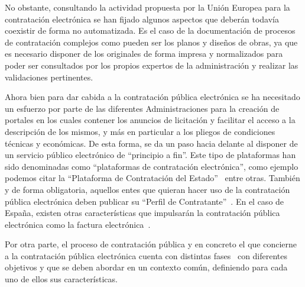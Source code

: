 No obstante, consultando la actividad propuesta por la Unión Europea para la contratación electrónica
se han fijado algunos aspectos que deberán todavía coexistir de forma no automatizada. Es el caso
de la documentación de procesos de contratación complejos como pueden ser los planos y diseños
de obras, ya que es necesario disponer de los originales de forma impresa y normalizados para poder ser consultados por
los propios expertos de la administración y realizar las validaciones pertinentes. 

Ahora bien para dar cabida a la contratación pública electrónica se ha necesitado un esfuerzo por parte
de las diferentes Administraciones para la creación de portales en los cuales contener los anuncios de licitación y facilitar
el acceso a la descripción de los mismos, y más en particular a los pliegos de condiciones técnicas y económicas. 
De esta forma, se da un paso hacia delante al disponer de un servicio público electrónico de ``principio a fin''. 
Este tipo de plataformas han sido denominadas como ``plataformas de contratación electrónica'', como ejemplo
podemos citar la ``Plataforma de Contratación del Estado''~\cite{PlataformaContratacionEstado} entre otras. 
También y de forma obligatoria, aquellos entes que quieran hacer uso de la contratación pública electrónica deben 
publicar su ``Perfil de Contratante''~\cite{PerfilContratante}. En el caso de España, existen otras características que impulsarán la 
contratación pública electrónica como la factura electrónica~\cite{FacturaElectronica}.

Por otra parte, el proceso de contratación pública y en concreto el que concierne a la contratación pública electrónica cuenta 
con distintas fases~\cite{siemensEval} con diferentes objetivos y que se deben abordar en un contexto común, definiendo 
para cada uno de ellos sus características. 


% 



